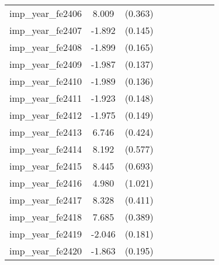 {\begin{tabular}{l*{4}{cc}}
imp\_year\_fe2406&    8.009\sym{***}&  (0.363)&                  &         &                  &         &                  &         \\
imp\_year\_fe2407&   -1.892\sym{***}&  (0.145)&                  &         &                  &         &                  &         \\
imp\_year\_fe2408&   -1.899\sym{***}&  (0.165)&                  &         &                  &         &                  &         \\
imp\_year\_fe2409&   -1.987\sym{***}&  (0.137)&                  &         &                  &         &                  &         \\
imp\_year\_fe2410&   -1.989\sym{***}&  (0.136)&                  &         &                  &         &                  &         \\
imp\_year\_fe2411&   -1.923\sym{***}&  (0.148)&                  &         &                  &         &                  &         \\
imp\_year\_fe2412&   -1.975\sym{***}&  (0.149)&                  &         &                  &         &                  &         \\
imp\_year\_fe2413&    6.746\sym{***}&  (0.424)&                  &         &                  &         &                  &         \\
imp\_year\_fe2414&    8.192\sym{***}&  (0.577)&                  &         &                  &         &                  &         \\
imp\_year\_fe2415&    8.445\sym{***}&  (0.693)&                  &         &                  &         &                  &         \\
imp\_year\_fe2416&    4.980\sym{***}&  (1.021)&                  &         &                  &         &                  &         \\
imp\_year\_fe2417&    8.328\sym{***}&  (0.411)&                  &         &                  &         &                  &         \\
imp\_year\_fe2418&    7.685\sym{***}&  (0.389)&                  &         &                  &         &                  &         \\
imp\_year\_fe2419&   -2.046\sym{***}&  (0.181)&                  &         &                  &         &                  &         \\
imp\_year\_fe2420&   -1.863\sym{***}&  (0.195)&                  &         &                  &         &                  &         \\

\end{tabular}}
